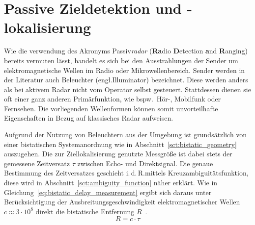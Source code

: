 \section{Passive Zieldetektion und -lokalisierung}

Wie die verwendung des Akronyms Passiv\emph{radar} (\textbf{Ra}dio %
\textbf{D}etection %
\textbf{a}nd \textbf{R}anging) bereits vermuten lässt, handelt es sich bei den Ausstrahlungen der Sender um elektromagnetische Wellen im Radio oder Mikrowellenbereich. Sender werden in der Literatur auch Beleuchter (engl.\@ Illuminator) bezeichnet. Diese werden anders als bei aktivem Radar nicht vom Operator selbst gesteuert. Stattdessen dienen sie oft einer ganz anderen Primärfunktion, wie bspw.\ Hör-, Mobilfunk oder Fernsehen. Die vorliegenden Wellenformen können somit unvorteilhafte Eigenschaften in Bezug auf klassisches Radar aufweisen.

Aufgrund der Nutzung von Beleuchtern aus der Umgebung ist grundsätzlich von einer bistatischen Systemanordnung wie in Abschnitt~\ref{sct:bistatic_geometry} auszugehen. Die zur Ziellokalisierung genutzte Messgröße ist dabei stets der gemessene Zeitversatz \(\tau \) zwischen Echo- und Direktsignal. Die genaue Bestimmung des Zeitversatzes geschieht i.\,d.\,R.\@ mittels Kreuzambiguitätsfunktion, diese wird in Abschnitt~\ref{sct:ambiguity_function} näher erklärt. Wie in Gleichung~\ref{eq:bistatic_delay_measurement} ergibt sich daraus unter Berücksichtigung der Ausbreitungsgeschwindigkeit elektromagnetischer Wellen \(c \approx 3\cdot10^8\) direkt die bistatische Entfernung \(R\)~\cite[S.~11]{Malanowski2019}.%
%
\begin{equation}
    R = c \cdot \tau
\end{equation}\label{eq:bistatic_delay_measurement}

